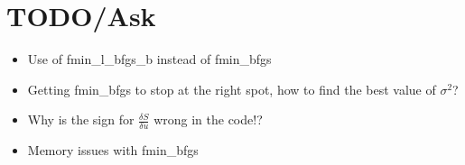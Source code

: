 \documentclass[a4paper, 12pt]{article}
\begin{document}
\section{TODO/Ask}
\begin{itemize}
\item Use of fmin\_l\_bfgs\_b instead of fmin\_bfgs
\item Getting fmin\_bfgs to stop at the right spot, how to find the best value of $\sigma^2$?
\item Why is the sign for $\frac{\delta S}{\delta u}$ wrong in the code!?
\item Memory issues with fmin\_bfgs
\end{itemize}
\end{document}
